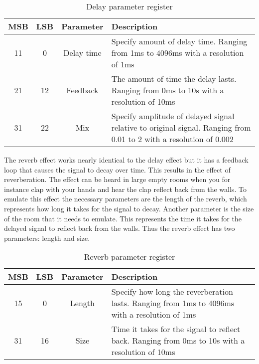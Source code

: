 \begin{table}[h!]
    \centering
    \begin{tabular}{|c|c|c|p{3.5in}|}
        \hline
        MSB & LSB & Parameter & Description\\
        \hline
        11 & 0 & Delay time & Specify amount of delay time. Ranging from 1ms to 4096ms with a resolution of 1ms\\
        \hline
        21 & 12 & Feedback & The amount of time the delay lasts. Ranging from 0ms to 10s with a resolution of 10ms\\
        \hline
        31 & 22 & Mix & Specify amplitude of delayed signal relative to original signal. Ranging from 0.01 to 2 with a resolution of 0.002\\
        \hline
    \end{tabular}
    \caption{Delay parameter register}
    \label{table:delay-effect-parameters}
\end{table}

The reverb effect works nearly identical to the delay effect but it has a feedback loop that causes the signal to decay over time. This results in the effect of reverberation. The effect can be heard in large empty rooms when you for instance clap with your hands and hear the clap reflect back from the walls. To emulate this effect the necessary parameters are the length of the reverb, which represents how long it takes for the signal to decay. Another parameter is the size of the room that it needs to emulate. This represents the time it takes for the delayed signal to reflect back from the walls. Thus the reverb effect has two parameters: length and size.

\begin{table}[h!]
    \centering
    \begin{tabular}{|c|c|c|p{3.5in}|}
        \hline
        MSB & LSB & Parameter & Description\\
        \hline
        15 & 0 & Length & Specify how long the reverberation lasts. Ranging from 1ms to 4096ms with a resolution of 1ms\\
        \hline
        31 & 16 & Size & Time it takes for the signal to reflect back. Ranging from 0ms to 10s with a resolution of 10ms\\
        \hline
    \end{tabular}
    \caption{Reverb parameter register}
    \label{table:reverb-effect-parameters}
\end{table}

